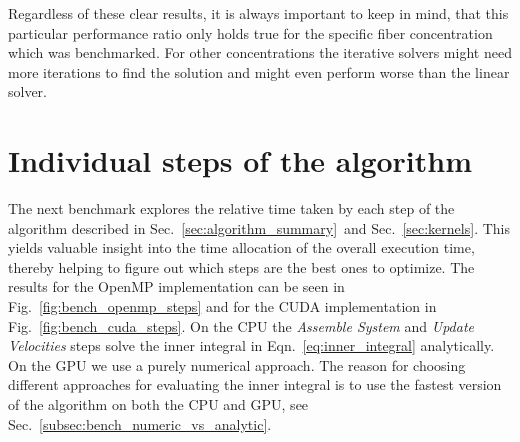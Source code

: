 Regardless of these clear results, it is always important to keep in mind, that this particular performance ratio only holds true for the specific fiber concentration which was benchmarked. For other concentrations the iterative solvers might need more iterations to find the solution and might even perform worse than the linear solver.

\section{Individual steps of the algorithm}
\vspace{-2.5em}
The next benchmark explores the relative time taken by each step of the algorithm described in Sec.~\ref{sec:algorithm_summary}~and Sec.~\ref{sec:kernels}. This yields valuable insight into the time allocation of the overall execution time, thereby helping to figure out which steps are the best ones to optimize. The results for the OpenMP implementation can be seen in Fig.~\ref{fig:bench_openmp_steps} and for the CUDA implementation in Fig.~\ref{fig:bench_cuda_steps}. On the CPU the \emph{Assemble System} and \emph{Update Velocities} steps solve the inner integral in Eqn.~\eqref{eq:inner_integral} analytically. On the GPU we use a purely numerical approach. The reason for choosing different approaches for evaluating the inner integral is to use the fastest version of the algorithm on both the CPU and GPU, see Sec.~\ref{subsec:bench_numeric_vs_analytic}.

